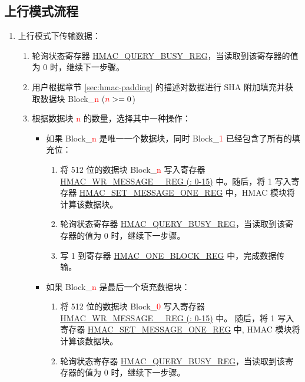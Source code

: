 \documentclass[main\_\_CN.tex]{subfiles}
\begin{document}
\subsection{上行模式流程}
\label{sec:hmac-upstream-process}

\begin{enumerate}
    \item 上行模式下传输数据：
    \begin{enumerate}
        \item 轮询状态寄存器 \hyperref[regdesc:HMACQUERYBUSYREG]{HMAC\_QUERY\_BUSY\_REG}，当读取到该寄存器的值为 0 时，继续下一步骤。
        \item 用户根据章节 \ref{sec:hmac-padding} 的描述对数据进行 SHA 附加填充并获取数据块 Block\_\textcolor{red}{n} ($\textcolor{red}{n}>=0$)
        \item 根据数据块 \textcolor{red}{n} 的数量，选择其中一种操作：
        \begin{itemize}
            \item 如果 Block\_\textcolor{red}{n} 是唯一一个数据块，同时 Block\_\textcolor{red}{1} 已经包含了所有的填充位：
            \begin{enumerate}
                \item 将 512 位的数据块 Block\_\textcolor{red}{n} 写入寄存器  \hyperref[regdesc:HMACWRMESSAGENREG]
                {HMAC\_WR\_MESSAGE\_\_REG (: 0-15)} 中。随后，将 1 写入寄存器 \hyperref[regdesc:HMACSETMESSAGEONEREG]{HMAC\_SET\_MESSAGE\_ONE\_REG} 中，HMAC 模块将计算该数据块。
                \item 轮询状态寄存器 \hyperref[regdesc:HMACQUERYBUSYREG]{HMAC\_QUERY\_BUSY\_REG}，当读取到该寄存器的值为 0 时，继续下一步骤。
                \item 写 1 到寄存器 \hyperref[regdesc:HMACONEBLOCKREG]{HMAC\_ONE\_BLOCK\_REG} 中，完成数据传输。
            \end{enumerate}
            \item 如果 Block\_\textcolor{red}{n} 是最后一个填充数据块：
            \begin{enumerate}
                \item 将 512 位的数据块 Block\_\textcolor{red}{0} 写入寄存器 \hyperref[regdesc:HMACWRMESSAGENREG]
                {HMAC\_WR\_MESSAGE\_\_REG (: 0-15)} 中。 随后，将 1 写入寄存器 \hyperref[regdesc:HMACSETMESSAGEONEREG]{HMAC\_SET\_MESSAGE\_ONE\_REG} 中, HMAC 模块将计算该数据块。
                \item 轮询状态寄存器 \hyperref[regdesc:HMACQUERYBUSYREG]{HMAC\_QUERY\_BUSY\_REG}，当读取到该寄存器的值为 0 时，继续下一步骤。

\end{enumerate}
\end{itemize}
\end{enumerate}
\end{enumerate}
\end{document}
